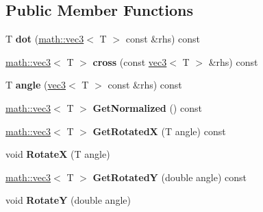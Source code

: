 \subsection*{Public Member Functions}
\begin{DoxyCompactItemize}
\item 
\hypertarget{classmath_1_1vec3_a6cbb8afea35370c0380f10fec301fe01}{
T {\bfseries dot} (\hyperlink{classmath_1_1vec3}{math::vec3}$<$ T $>$ const \&rhs) const }
\label{classmath_1_1vec3_a6cbb8afea35370c0380f10fec301fe01}

\item 
\hypertarget{classmath_1_1vec3_a3690718d39b1e8f0a8343137b23c4cfe}{
\hyperlink{classmath_1_1vec3}{math::vec3}$<$ T $>$ {\bfseries cross} (const \hyperlink{classmath_1_1vec3}{vec3}$<$ T $>$ \&rhs) const }
\label{classmath_1_1vec3_a3690718d39b1e8f0a8343137b23c4cfe}

\item 
\hypertarget{classmath_1_1vec3_a57e9cdf743e97f6256aa72af644c3543}{
T {\bfseries angle} (\hyperlink{classmath_1_1vec3}{vec3}$<$ T $>$ const \&rhs) const }
\label{classmath_1_1vec3_a57e9cdf743e97f6256aa72af644c3543}

\item 
\hypertarget{classmath_1_1vec3_ad943b48e270a599e86a8438c74b982ec}{
\hyperlink{classmath_1_1vec3}{math::vec3}$<$ T $>$ {\bfseries GetNormalized} () const }
\label{classmath_1_1vec3_ad943b48e270a599e86a8438c74b982ec}

\item 
\hypertarget{classmath_1_1vec3_ac98e7df59b4ba1121ff990a6019780dd}{
\hyperlink{classmath_1_1vec3}{math::vec3}$<$ T $>$ {\bfseries GetRotatedX} (T angle) const }
\label{classmath_1_1vec3_ac98e7df59b4ba1121ff990a6019780dd}

\item 
\hypertarget{classmath_1_1vec3_a7be25b0c678eb591a1fc67fd411775fa}{
void {\bfseries RotateX} (T angle)}
\label{classmath_1_1vec3_a7be25b0c678eb591a1fc67fd411775fa}

\item 
\hypertarget{classmath_1_1vec3_ac38729bb7d1a37203b805abe30b6aded}{
\hyperlink{classmath_1_1vec3}{math::vec3}$<$ T $>$ {\bfseries GetRotatedY} (double angle) const }
\label{classmath_1_1vec3_ac38729bb7d1a37203b805abe30b6aded}

\item 
\hypertarget{classmath_1_1vec3_a2da382572748410a8b83b5a5cb81779f}{
void {\bfseries RotateY} (double angle)}
\label{classmath_1_1vec3_a2da382572748410a8b83b5a5cb81779f}


\end{DoxyCompactItemize}
